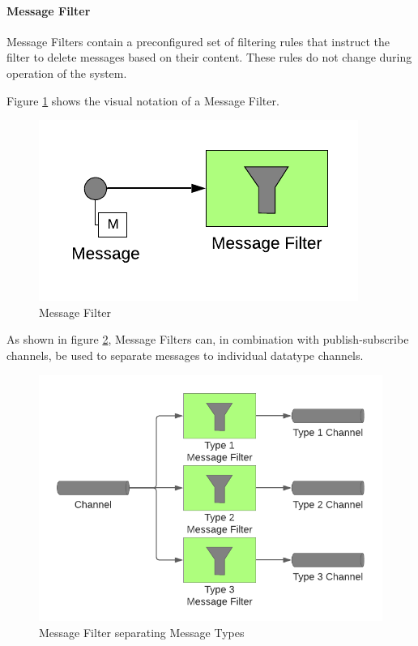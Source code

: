 \paragraph{Message Filter}

Message Filters contain a preconfigured set of filtering rules that instruct the filter to delete messages based on their content. These rules do not change during operation of the system.

Figure \ref{messaging:filter1} shows the visual notation of a Message Filter.

\begin{figure}[H]
    \centering
    \includegraphics[scale=0.6]{Diagrams/Messaging/8. Message Filter.pdf}
    \caption{Message Filter}
    \label{messaging:filter1}
\end{figure}

As shown in figure \ref{messaging:filter2}, Message Filters can, in combination with publish-subscribe channels, be used to separate messages to individual datatype channels.

\begin{figure}[H]
    \centering
    \includegraphics[scale=0.6]{Diagrams/Messaging/9. Message Filter.pdf}
    \caption{Message Filter separating Message Types}
    \label{messaging:filter2}
\end{figure}

